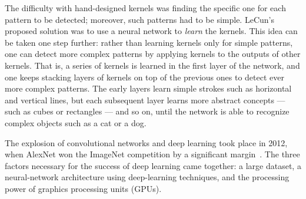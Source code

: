 The difficulty with hand-designed kernels was finding the specific one for each
pattern to be detected; moreover, such patterns had to be simple. LeCun's
proposed solution was to use a neural network to \emph{learn} the kernels. This
idea can be taken one step further: rather than learning kernels only for simple
patterns, one can detect more complex patterns by applying kernels to the
outputs of other kernels. That is, a series of kernels is learned in the first
layer of the network, and one keeps stacking layers of kernels on top of the
previous ones to detect ever more complex patterns. The early layers learn
simple strokes such as horizontal and vertical lines, but each subsequent layer
learns more abstract concepts --- such as cubes or rectangles --- and so on,
until the network is able to recognize complex objects such as a cat or a dog.

The explosion of convolutional networks and deep learning took place in 2012,
when AlexNet won the ImageNet competition by a significant
margin~\citep{krizhevsky2012alexnet}. The three factors necessary for the
success of deep learning came together: a large dataset, a neural-network
architecture using deep-learning techniques, and the processing power of
graphics processing units (GPUs).

